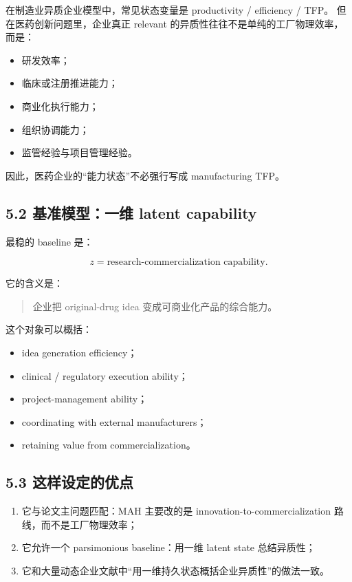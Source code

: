 \documentclass[12pt]{ctexart}
\begin{document}
在制造业异质企业模型中，常见状态变量是 productivity / efficiency / TFP。
但在医药创新问题里，企业真正 relevant 的异质性往往不是单纯的工厂物理效率，而是：

\begin{itemize}[leftmargin=2em]
    \item 研发效率；
    \item 临床或注册推进能力；
    \item 商业化执行能力；
    \item 组织协调能力；
    \item 监管经验与项目管理经验。
\end{itemize}

因此，医药企业的“能力状态”不必强行写成 manufacturing TFP。

\subsection{5.2 基准模型：一维 latent capability}

最稳的 baseline 是：

\[
z=\text{research-commercialization capability}.
\]

它的含义是：

\begin{quote}
企业把 original-drug idea 变成可商业化产品的综合能力。
\end{quote}

这个对象可以概括：

\begin{itemize}[leftmargin=2em]
    \item idea generation efficiency；
    \item clinical / regulatory execution ability；
    \item project-management ability；
    \item coordinating with external manufacturers；
    \item retaining value from commercialization。
\end{itemize}

\subsection{5.3 这样设定的优点}

\begin{enumerate}[leftmargin=2em]
    \item 它与论文主问题匹配：MAH 主要改的是 innovation-to-commercialization 路线，而不是工厂物理效率；
    \item 它允许一个 parsimonious baseline：用一维 latent state 总结异质性；
    \item 它和大量动态企业文献中“用一维持久状态概括企业异质性”的做法一致。
\end{enumerate}
\end{document}
